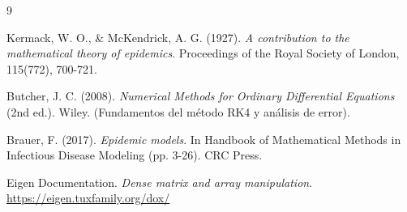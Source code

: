 \documentclass[12pt,a4paper]{article}
\theoremstyle{definition}
\begin{document}
\begin{thebibliography}{9}

 Kermack, W. O., \& McKendrick, A. G. (1927). \textit{A contribution to the mathematical theory of epidemics}. Proceedings of the Royal Society of London, 115(772), 700-721.

 Butcher, J. C. (2008). \textit{Numerical Methods for Ordinary Differential Equations} (2nd ed.). Wiley. (Fundamentos del m\'{e}todo RK4 y an\'{a}lisis de error).

 Brauer, F. (2017). \textit{Epidemic models}. In Handbook of Mathematical Methods in Infectious Disease Modeling (pp. 3-26). CRC Press.

 Eigen Documentation. \textit{Dense matrix and array manipulation}. \url{https://eigen.tuxfamily.org/dox/}

\end{thebibliography}
\end{document}
